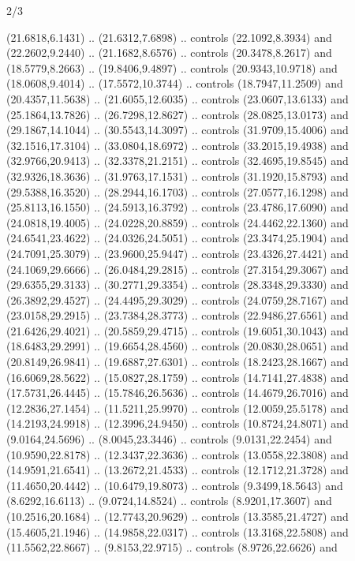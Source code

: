\begin{flagdescription}{2/3}
\begin{scope}[yshift=\flagwidth,scale=\flagwidth/1241.93737]
\begin{scope}[y=-1mm, x=1mm,draw=gold,fill=blue,line join=miter,miter limit=4,line width=1.8\lw]
\begin{scope}[y=1mm, x=1mm, yscale=-1,shift={(573.68mm+\str,145.75)}]
\begin{scope}[scale=1.35,shift={(-9,-3)}]
\begin{scope}[scale=0.55]
\begin{scope}[scale=1.333]
    (21.6818,6.1431) .. (21.6312,7.6898) .. controls (22.1092,8.3934) and
    (22.2602,9.2440) .. (21.1682,8.6576) .. controls (20.3478,8.2617) and
    (18.5779,8.2663) .. (19.8406,9.4897) .. controls (20.9343,10.9718) and
    (18.0608,9.4014) .. (17.5572,10.3744) .. controls (18.7947,11.2509) and
    (20.4357,11.5638) .. (21.6055,12.6035) .. controls (23.0607,13.6133) and
    (25.1864,13.7826) .. (26.7298,12.8627) .. controls (28.0825,13.0173) and
    (29.1867,14.1044) .. (30.5543,14.3097) .. controls (31.9709,15.4006) and
    (32.1516,17.3104) .. (33.0804,18.6972) .. controls (33.2015,19.4938) and
    (32.9766,20.9413) .. (32.3378,21.2151) .. controls (32.4695,19.8545) and
    (32.9326,18.3636) .. (31.9763,17.1531) .. controls (31.1920,15.8793) and
    (29.5388,16.3520) .. (28.2944,16.1703) .. controls (27.0577,16.1298) and
    (25.8113,16.1550) .. (24.5913,16.3792) .. controls (23.4786,17.6090) and
    (24.0818,19.4005) .. (24.0228,20.8859) .. controls (24.4462,22.1360) and
    (24.6541,23.4622) .. (24.0326,24.5051) .. controls (23.3474,25.1904) and
    (24.7091,25.3079) .. (23.9600,25.9447) .. controls (23.4326,27.4421) and
    (24.1069,29.6666) .. (26.0484,29.2815) .. controls (27.3154,29.3067) and
    (29.6355,29.3133) .. (30.2771,29.3354) .. controls (28.3348,29.3330) and
    (26.3892,29.4527) .. (24.4495,29.3029) .. controls (24.0759,28.7167) and
    (23.0158,29.2915) .. (23.7384,28.3773) .. controls (22.9486,27.6561) and
    (21.6426,29.4021) .. (20.5859,29.4715) .. controls (19.6051,30.1043) and
    (18.6483,29.2991) .. (19.6654,28.4560) .. controls (20.0830,28.0651) and
    (20.8149,26.9841) .. (19.6887,27.6301) .. controls (18.2423,28.1667) and
    (16.6069,28.5622) .. (15.0827,28.1759) .. controls (14.7141,27.4838) and
    (17.5731,26.4445) .. (15.7846,26.5636) .. controls (14.4679,26.7016) and
    (12.2836,27.1454) .. (11.5211,25.9970) .. controls (12.0059,25.5178) and
    (14.2193,24.9918) .. (12.3996,24.9450) .. controls (10.8724,24.8071) and
    (9.0164,24.5696) .. (8.0045,23.3446) .. controls (9.0131,22.2454) and
    (10.9590,22.8178) .. (12.3437,22.3636) .. controls (13.0558,22.3808) and
    (14.9591,21.6541) .. (13.2672,21.4533) .. controls (12.1712,21.3728) and
    (11.4650,20.4442) .. (10.6479,19.8073) .. controls (9.3499,18.5643) and
    (8.6292,16.6113) .. (9.0724,14.8524) .. controls (8.9201,17.3607) and
    (10.2516,20.1684) .. (12.7743,20.9629) .. controls (13.3585,21.4727) and
    (15.4605,21.1946) .. (14.9858,22.0317) .. controls (13.3168,22.5808) and
    (11.5562,22.8667) .. (9.8153,22.9715) .. controls (8.9726,22.6626) and

\end{scope}
\end{scope}
\end{scope}
\end{scope}
\end{scope}
\end{scope}
\end{flagdescription}
